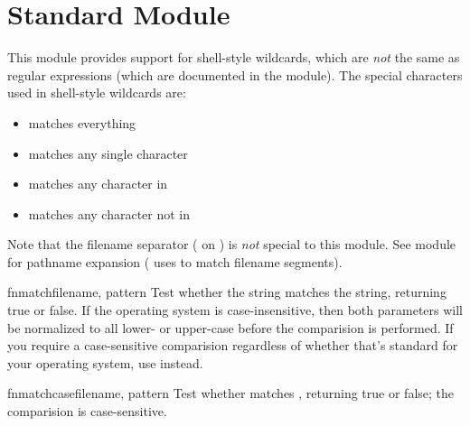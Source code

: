 \section{Standard Module }
\label{module-fnmatch}

This module provides support for \UNIX{} shell-style wildcards, which
are \emph{not} the same as regular expressions (which are documented
in the  module).  The special characters
used in shell-style wildcards are:
\begin{itemize}
\item[\code{*}] matches everything
\item[\code{?}]	matches any single character
\item[\code{[}\var{seq}\code{]}] matches any character in 
\item[\code{[!}\var{seq}\code{]}] matches any character not in 
\end{itemize}

Note that the filename separator ( on \UNIX{}) is \emph{not}
special to this module.  See module 
for pathname expansion ( uses  to
match filename segments).

\renewcommand{\indexsubitem}{(in module fnmatch)}

\begin{funcdesc}{fnmatch}{filename, pattern}
Test whether the  string matches the 
string, returning true or false.  If the operating system is
case-insensitive, then both parameters will be normalized to all
lower- or upper-case before the comparision is performed.  If you
require a case-sensitive comparision regardless of whether that's
standard for your operating system, use  instead.
\end{funcdesc}

\begin{funcdesc}{fnmatchcase}{filename, pattern}
Test whether  matches , returning true or
false; the comparision is case-sensitive.
\end{funcdesc}

\begin{seealso}

\end{seealso}
